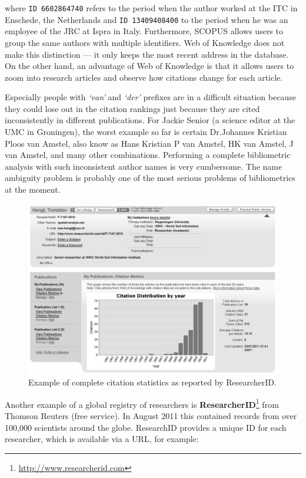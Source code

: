 \documentclass[graybox,envcountchap,sectrefs,UStrade]{svmono}
\begin{document}
\noindent where \texttt{ID 6602864740} refers to the period when the author worked at the ITC in Enschede, the Netherlands and \texttt{ID 13409408400} to the period when he was an employee of the JRC at Ispra in Italy. Furthermore, SCOPUS allows users to group the same authors with multiple identifiers. Web of Knowledge does not make this distinction --- it only keeps the most recent address in the database. On the other hand, an advantage of Web of Knowledge is that it allows users to zoom into research articles and observe how citations change for each article. \par

Especially people with \emph{`van'} and \emph{`der'} prefixes are in a difficult situation because they could lose out in the citation rankings just because they are cited inconsistently in different publications. For Jackie Senior (a science editor at the UMC in Groningen), the worst example so far is certain Dr.\@ Johannes Kristian Ploos van Amstel, also know as Hans Kristian P van Amstel, HK van Amstel, J van Amstel, and many other combinations. Performing a complete bibliometric analysis with such inconsistent author names is very cumbersome. The name ambiguity problem is probably one of the most serious problems of bibliometrics at the moment.\par

\begin{figure}
\begin{center}
  \includegraphics[width=.8\textwidth]{Fig_citation_metrics_Hengl.jpg}
\caption{Example of complete citation statistics as reported by ResearcherID.} \label{Fig:citation_metrics_Hengl}
\end{center}
\end{figure}

Another example of a global registry of researchers is \textbf{ResearcherID}\footnote{\url{http://www.researcherid.com}} from Thomson Reuters (free service). In August 2011 this contained records from over 100,000 scientists around the globe. ResearchID provides a unique ID for each researcher, which is available via a URL, for example:
\end{document}
